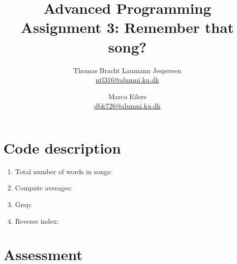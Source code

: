 \documentclass[a4paper]{article}
\title{Advanced Programming\\ Assignment 3: Remember that song?}
\author{Thomas Bracht Laumann Jespersen\\ \url{ntl316@alumni.ku.dk} \and Marco Eilers\\ \url{dbk726@alumni.ku.dk} }
\begin{document}
\maketitle
\section*{Code description}

\begin{enumerate}
\item Total number of words in songs:
\item Compute averages:
\item Grep:
\item Reverse index:
\end{enumerate}

\section*{Assessment}
\end{document}
